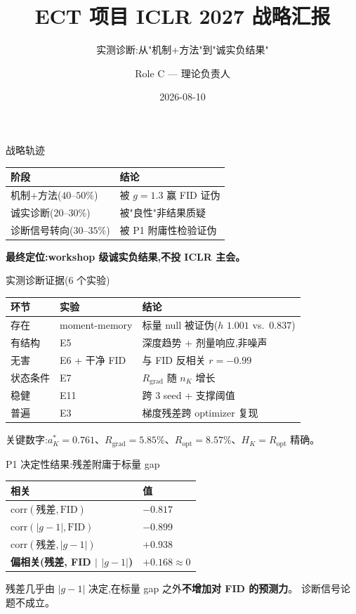 \documentclass[UTF8,aspectratio=169]{ctexbeamer}
\title[ECT ICLR 2027 汇报]{ECT 项目 ICLR 2027 战略汇报}
\subtitle{实测诊断:从"机制+方法"到"诚实负结果"}
\author{Role C --- 理论负责人}
\date{2026-08-10}
\begin{document}
\begin{frame}
\titlepage
\end{frame}

\begin{frame}{战略轨迹}
\begin{center}
\begin{tabular}{@{}ll@{}}
\toprule
阶段 & 结论 \\
\midrule
机制+方法($40$--$50\%$) & 被 $g{=}1.3$ 赢 FID 证伪 \\
诚实诊断($20$--$30\%$) & 被"良性"非结果质疑 \\
诊断信号转向($30$--$35\%$) & 被 P1 附庸性检验证伪 \\
\bottomrule
\end{tabular}
\end{center}
\vspace{1em}
\textbf{最终定位:workshop 级诚实负结果,不投 ICLR 主会。}
\end{frame}

\begin{frame}{实测诊断证据(6 个实验)}
\begin{center}
\small
\begin{tabular}{@{}lll@{}}
\toprule
环节 & 实验 & 结论 \\
\midrule
存在 & moment-memory & 标量 null 被证伪($h$ $1.001$ vs.\ $0.837$) \\
有结构 & E5 & 深度趋势 + 剂量响应,非噪声 \\
无害 & E6 + 干净 FID & 与 FID 反相关 $r{=}{-}0.99$ \\
状态条件 & E7 & $R_{\mathrm{grad}}$ 随 $n_K$ 增长 \\
稳健 & E11 & 跨 3 seed + 支撑阈值 \\
普遍 & E3 & 梯度残差跨 optimizer 复现 \\
\bottomrule
\end{tabular}
\end{center}
\vspace{0.5em}
\small 关键数字:$a_K^*{=}0.761$、$R_{\mathrm{grad}}{=}5.85\%$、$R_{\mathrm{opt}}{=}8.57\%$、$H_K{=}R_{\mathrm{opt}}$ 精确。
\end{frame}

\begin{frame}{P1 决定性结果:残差附庸于标量 gap}
\begin{center}
\begin{tabular}{@{}ll@{}}
\toprule
相关 & 值 \\
\midrule
$\mathrm{corr}(\text{残差},\text{FID})$ & $-0.817$ \\
$\mathrm{corr}(|g-1|,\text{FID})$ & $-0.899$ \\
$\mathrm{corr}(\text{残差},|g-1|)$ & $+0.938$ \\
\textbf{偏相关(残差, FID $|$ $|g-1|$)} & \textbf{$+0.168\approx 0$} \\
\bottomrule
\end{tabular}
\end{center}
\vspace{0.5em}
残差几乎由 $|g-1|$ 决定,在标量 gap 之外\textbf{不增加对 FID 的预测力}。
诊断信号论题不成立。
\end{frame}
\end{document}
